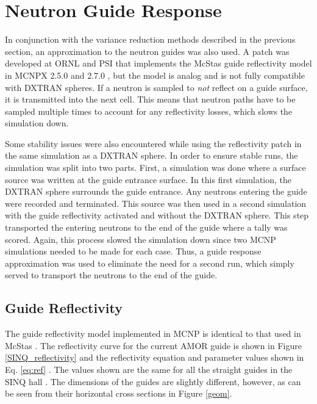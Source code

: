 \documentclass[a4paper]{jpconf}
\begin{document}
\section{Neutron Guide Response} 

In conjunction with the variance reduction methods described in the previous section, an approximation to the neutron guides was also used.  A patch was developed at ORNL and PSI that implements the McStas guide reflectivity model in MCNPX 2.5.0 and 2.7.0 \cite{mcnp_reflectivity, EK_reflectivity}, but the model is analog and is not fully compatible with DXTRAN spheres.  If a neutron is sampled to \emph{not} reflect on a guide surface, it is transmitted into the next cell.  This means that neutron paths have to be sampled multiple times to account for any reflectivity losses, which slows the simulation down.  

Some stability issues were also encountered while using the reflectivity patch in the same simulation as a DXTRAN sphere.  In order to ensure stable runs, the simulation was split into two parts.  First, a simulation was done where a surface source was written at the guide entrance surface.  In this first simulation, the DXTRAN sphere surrounds the guide entrance.  Any neutrons entering the guide were recorded and terminated.  This source was then used in a second simulation with the guide reflectivity activated and without the DXTRAN sphere.  This step transported the entering neutrons to the end of the guide where a tally was scored.  Again, this process slowed the simulation down since two MCNP simulations needed to be made for each case.  Thus, a guide response approximation was used to eliminate the need for a second run, which simply served to transport the neutrons to the end of the guide.


\subsection{Guide Reflectivity}

The guide reflectivity model implemented in MCNP is identical to that used in McStas \cite{mcnp_reflectivity}.  The reflectivity curve for the current AMOR guide is shown in Figure \ref{SINQ_reflectivity} and the reflectivity equation and parameter values shown in Eq. \ref{eq:ref} \cite{mcstas}.  The values shown are the same for all the straight guides in the SINQ hall \cite{SINQ_guide_values}.  The dimensions of the guides are slightly different, however, as can be seen from their horizontal cross sections in Figure \ref{geom}.
\end{document}

